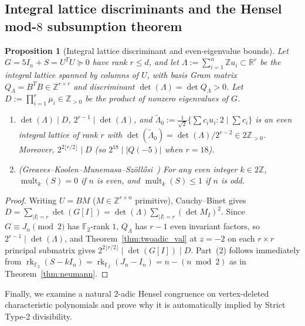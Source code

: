 \documentclass[11pt,reqno]{amsart}
\newtheorem{proposition}[theorem]{Proposition}
\theoremstyle{definition}
\theoremstyle{remark}
\numberwithin{equation}{section}
\numberwithin{table}{section}
\DeclareMathOperator{\rk}{rk}
\DeclareMathOperator{\mult}{mult}
\begin{document}
\subsection{Integral lattice discriminants and the Hensel \texorpdfstring{mod-$8$}{mod-8} subsumption theorem}
\begin{proposition}[Integral lattice discriminant and even-eigenvalue bounds]\label{prop:lattice_gkms}
Let $G = 5I_n + S = U^T U \succeq 0$ have rank $r \le d$, and let $\Lambda := \sum_{i=1}^n \mathbb{Z} u_i \subset \mathbb{R}^r$ be the integral lattice spanned by columns of $U$, with basis Gram matrix $Q_\Lambda = B^T B \in \mathbb{Z}^{r \times r}$ and discriminant $\det(\Lambda) = \det Q_\Lambda > 0$. Let $D := \prod_{i=1}^r \mu_i \in \mathbb{Z}_{>0}$ be the product of nonzero eigenvalues of $G$.
\begin{enumerate}
  \item $\det(\Lambda) \mid D$, $2^{r-1} \mid \det(\Lambda)$, and $\tilde{\Lambda}_0 := \frac{1}{\sqrt{2}}\{\sum c_i u_i : 2 \mid \sum c_i\}$ is an even integral lattice of rank $r$ with $\det(\tilde{\Lambda}_0) = \det(\Lambda)/2^{r-2} \in 2\mathbb{Z}_{>0}$. Moreover, $2^{2\lfloor r/2 \rfloor} \mid D$ (so $2^{18} \mid |Q(-5)|$ when $r = 18$).
  \item \emph{(Greaves--Koolen--Munemasa--Sz\"oll\H{o}si~\cite{GKMS2016})} For any even integer $k \in 2\mathbb{Z}$, $\mult_k(S) = 0$ if $n$ is even, and $\mult_k(S) \le 1$ if $n$ is odd.
\end{enumerate}
\end{proposition}

\begin{proof}
Writing $U = B M$ ($M \in \mathbb{Z}^{r \times n}$ primitive), Cauchy--Binet gives $D = \sum_{|I|=r} \det(G[I]) = \det(\Lambda)\sum_{|I|=r}(\det M_I)^2$. Since $G \equiv J_n \pmod 2$ has $\mathbb{F}_2$-rank $1$, $Q_\Lambda$ has $r - 1$ even invariant factors, so $2^{r-1} \mid \det(\Lambda)$, and Theorem~\ref{thm:twoadic_val} at $z = -2$ on each $r \times r$ principal submatrix gives $2^{2\lfloor r/2 \rfloor} \mid \det(G[I]) \mid D$. Part~(2) follows immediately from $\rk_{\mathbb{F}_2}(S - kI_n) = \rk_{\mathbb{F}_2}(J_n - I_n) = n - (n \bmod 2)$ as in Theorem~\ref{thm:neumann}.
\end{proof}

Finally, we examine a natural $2$-adic Hensel congruence on vertex-deleted characteristic polynomials and prove why it is automatically implied by Strict Type-2 divisibility.
\end{document}

